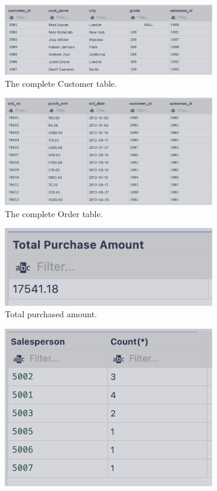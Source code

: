 \captionsetup{justification=centering}
\begin{figure}[H]
    \begin{subfigure}{1\textwidth}
        \centering
        \includegraphics[width=\linewidth]{images/output/cust.png}
        \caption*{The complete Customer table.}
        \label{fig:cust}
    \end{subfigure}
    \begin{subfigure}{1\textwidth}
        \centering
        \includegraphics[width=.6\linewidth]{images/output/ord.png}
        \caption*{The complete Order table.}
        \label{fig:ord}
    \end{subfigure}
    \vspace*{10mm}
    \begin{subfigure}{.5\textwidth}
        \centering
        \includegraphics[width=.8\linewidth]{images/output/q1.png}
        \caption*{Total purchased amount.}
        \label{fig:q1}
    \end{subfigure}
    \begin{subfigure}{.5\textwidth}
        \centering
        \includegraphics[width=.8\linewidth]{images/output/q2.png}

\end{subfigure}
\end{figure}
